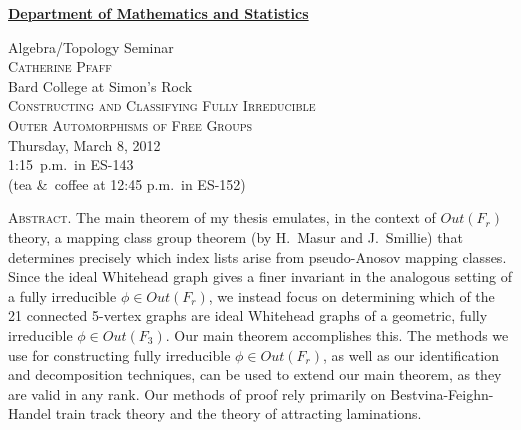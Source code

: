 \documentclass[12pt]{article}
\begin{document}
\noindent\hspace{-28pt}\raisebox{-19pt}{\XeTeXpicfile UAlogo.jpg scaled 340}%
\hfill\textsf{\textbf{\footnotesize\href{http://www.albany.edu/math/}{Department of Mathematics and Statistics}}}\bigskip\bigskip

\begin{center}\Large
  \textsf{\huge Algebra/Topology Seminar}\\[2.5\bigskipamount]
  \textsc{Catherine Pfaff}\\
  {\large Bard College at Simon's Rock}\\[\bigskipamount]
  \textsc{Constructing and Classifying Fully Irreducible\\Outer
Automorphisms of Free Groups}\\[2\bigskipamount]
  Thursday, March 8, 2012\\ 1:15~p.m.\ in ES-143\\
  (tea \&\ coffee at 12:45 p.m.\ in ES-152)
\end{center}\bigskip\bigskip

\noindent\large\textsc{Abstract.}
The main theorem of my thesis emulates, in the context of $Out(F_r)$ theory, a mapping class group theorem (by H.~Masur and J.~Smillie) that determines precisely which index lists arise from pseudo-Anosov mapping classes.  Since the ideal Whitehead graph gives a finer invariant in the analogous setting of a fully irreducible $\phi \in Out(F_r)$, we instead focus on determining which of the 21 connected 5-vertex graphs are ideal Whitehead graphs of a geometric, fully irreducible $\phi \in Out(F_3)$.  Our main theorem accomplishes this. The methods we use for constructing fully irreducible $\phi\in Out(F_r)$, as well as our identification and decomposition techniques, can be used to extend our main theorem, as they are valid in any rank.  Our methods of proof rely primarily on Bestvina-Feighn-Handel train track theory and the theory of attracting laminations.
\end{document}
